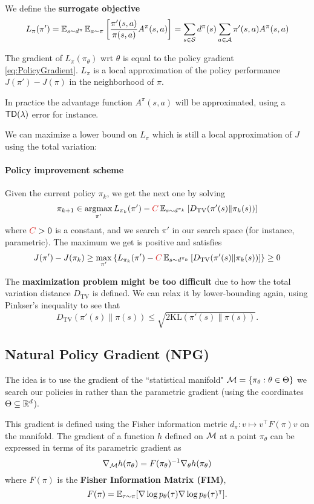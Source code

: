 \documentclass[../course-notes.tex]{subfiles}
\begin{document}
We define the \textbf{\bluefont surrogate objective}
\begin{equation}
	L_\pi(\pi') =
	\operatorname{\mathbb{E}}_{s\sim d^\pi}\operatorname{\mathbb{E}}_{a\sim \pi}\left[
	\frac{\pi'(s,a)}{\pi(s,a)}A^\pi(s,a)
	\right]
	= \sum_{s\in\mathcal{S}} d^\pi(s) \sum_{a\in\mathcal{A}} \pi'(s,a)	A^\pi(s,a)
\end{equation}

The gradient of $L_\pi(\pi_\theta)$ wrt $\theta$ is equal to the policy gradient \eqref{eq:PolicyGradient}. $L_\pi$ is a local approximation of the policy performance $J(\pi') - J(\pi)$ in the neighborhood of $\pi$.

In practice the advantage function $A^\pi(s,a)$ will be approximated, using a $\mathsf{TD}(\lambda)$ error for instance.

We can maximize a lower bound on $L_\pi$ which is still a local approximation of $J$ using the total variation:
\paragraph{Policy improvement scheme} Given the current policy $\pi_k$, we get the next one by solving
\[
	\pi_{k+1} \in\argmax_{\pi'} L_{\pi_k}(\pi') - {\redfont C}
	\EE_{s\sim d^{\pi_k}}\left[
	D_{\mathrm{TV}}(\pi'(s) \| \pi_k(s))
	\right]
\]
where ${\redfont C} > 0$ is a constant, and we search $\pi'$ in our search space (for instance, parametric). The maximum we get is positive and satisfies
\[
	J(\pi') - J(\pi_k) \geq
	\max_{\pi'} \left\{ L_{\pi_k}(\pi') - {\redfont C}
	\EE_{s\sim d^{\pi_k}}\left[
	D_{\mathrm{TV}}(\pi'(s) \| \pi_k(s))
	\right] \right\}
	\geq 0
\]

The \textbf{\redfont maximization problem might be too difficult} due to how the total variation distance $D_\mathrm{TV}$ is defined. We can relax it by lower-bounding again, using Pinkser's inequality to see that
\[
	D_\mathrm{TV}(\pi'(s)\|\pi(s)) \leq \sqrt{2\mathrm{KL}(\pi'(s)\|\pi(s))}.
\]


\subsection{Natural Policy Gradient (NPG)}

The idea is to use the gradient of the ``statistical manifold" $\mathcal{M} = \{\pi_\theta:\theta\in\Theta\}$ we search our policies in rather than the parametric gradient (using the coordinates $\Theta \subseteq \mathbb{R}^d$).

This gradient is defined using the Fisher information metric $d_{\pi}:v \mapsto v^\intercal F(\pi) v$ on the manifold. The gradient of a function $h$ defined on $\mathcal{M}$ at a point $\pi_\theta$ can be expressed in terms of its parametric gradient as
\[
	\nabla_{\mathcal{M}} h(\pi_\theta) = F(\pi_\theta)^{-1}\nabla_\theta h(\pi_\theta)
\]
where $F(\pi)$ is the {\bfseries\bluefont Fisher Information Matrix (FIM)},
\[
	F(\pi) = \operatorname{\mathbb{E}}_{\tau\sim \pi}[\nabla\log p_\theta(\tau) \nabla\log p_\theta(\tau)^\intercal].
\]
\end{document}
